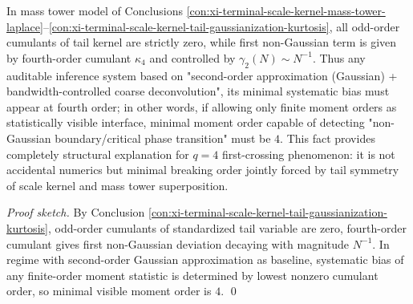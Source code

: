 \begin{conclusion}[Regularization status of \texorpdfstring{$(q=4)$}{(q=4)}: fourth-order breaking determines minimal moment order of visible phase transition]\label{con:xi-terminal-scale-kernel-q4-minimal-visible-order}
In mass tower model of Conclusions \ref{con:xi-terminal-scale-kernel-mass-tower-laplace}--\ref{con:xi-terminal-scale-kernel-tail-gaussianization-kurtosis}, all odd-order cumulants of tail kernel are strictly zero, while first non-Gaussian term is given by fourth-order cumulant \(\kappa_4\) and controlled by
\(\gamma_2(N)\sim N^{-1}\).
Thus any auditable inference system based on "second-order approximation (Gaussian) + bandwidth-controlled coarse deconvolution", its minimal systematic bias must appear at fourth order;
in other words, if allowing only finite moment orders as statistically visible interface, minimal moment order capable of detecting "non-Gaussian boundary/critical phase transition" must be \(4\).
This fact provides completely structural explanation for \(q=4\) first-crossing phenomenon: it is not accidental numerics but minimal breaking order jointly forced by tail symmetry of scale kernel and mass tower superposition.
\end{conclusion}

\begin{proof}[Proof sketch]
By Conclusion \ref{con:xi-terminal-scale-kernel-tail-gaussianization-kurtosis}, odd-order cumulants of standardized tail variable are zero, fourth-order cumulant gives first non-Gaussian deviation decaying with magnitude \(N^{-1}\).
In regime with second-order Gaussian approximation as baseline, systematic bias of any finite-order moment statistic is determined by lowest nonzero cumulant order, so minimal visible moment order is \(4\). \qed
\end{proof}


